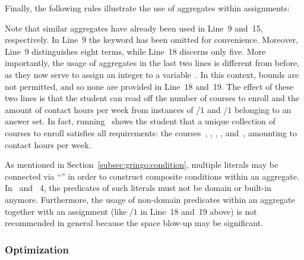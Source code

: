 \begin{example}
Finally, the following rules illustrate the use of aggregates within assignments:
%

%
Note that similar aggregates have already been used in Line~9 and~15, respectively.
In Line~9 the keyword  has been omitted for convenience.
Moreover, Line~9 distinguishes eight terms, while Line~18 discerns only five.
More importantly, the usage of aggregates in the last two lines is different from before,
as they now serve to assign an integer to a variable~.
In this context, bounds are not permitted, and so none are provided in Line~18 and~19.
The effect of these two lines is that the student can read off the number of
courses to enroll and the amount of contact hours per week from instances of
/$1$ and /$1$ belonging to an answer set.%
%
In fact, running \clasp\ shows the student that a unique
collection of~ courses to enroll satisfies all requirements:
the courses~, , , , and~,
amounting to~ contact hours per week.

As mentioned in Section~\ref{subsec:gringo:condition},
multiple literals may be connected via ``\code{,}'' in order to construct
composite conditions within an aggregate.
In \gringo\ and \clingo~4,
the predicates of such literals must not be domain or built-in anymore.
Furthermore, the usage of non-domain predicates within an aggregate
together with an assignment (like /$1$ in Line~18 and~19 above)
is not recommended in general because the space blow-up may be significant.
\eexample
\end{example}


\subsubsection{Optimization}\label{subsec:gringo:optimize}

